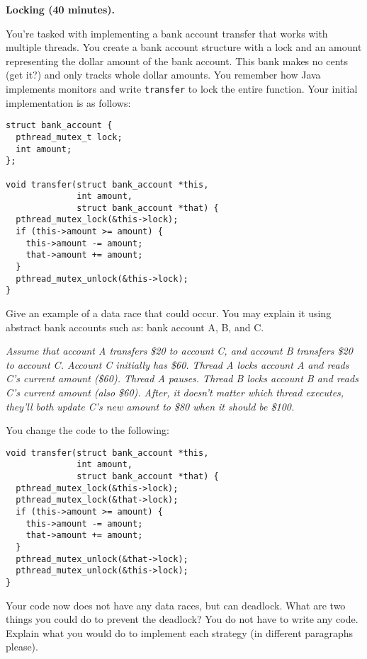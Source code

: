 \documentclass[12pt]{article}
\newenvironment{answer}{\begin{adjustwidth}{1cm}{}\itshape}{\end{adjustwidth}}
\begin{document}
\textbf{Locking (40 minutes).}

\vspace{1em}

You're tasked with implementing a bank account transfer that works with
multiple threads. You create a bank account structure with a lock and an amount
representing the dollar amount of the bank account. This bank makes no cents
(get it?) and only tracks whole dollar amounts. You remember how Java implements
monitors and write \texttt{transfer} to lock the entire function. Your initial
implementation is as follows:

\begin{lstlisting}
struct bank_account {
  pthread_mutex_t lock;
  int amount;
};

void transfer(struct bank_account *this,
              int amount,
              struct bank_account *that) {
  pthread_mutex_lock(&this->lock);
  if (this->amount >= amount) {
    this->amount -= amount;
    that->amount += amount;
  }
  pthread_mutex_unlock(&this->lock);
}
\end{lstlisting}

Give an example of a data race that could occur. You may explain it using
abstract bank accounts such as: bank account A, B, and C.

\begin{answer}
  Assume that account A transfers \$20 to account C, and account B transfers
  \$20 to account C. Account C initially has \$60. Thread A locks account
  A and reads C's current amount (\$60). Thread A pauses. Thread B locks account
  B and reads C's current amount (also \$60). After, it doesn't matter which
  thread executes, they'll both update C's new amount to \$80 when it should be
  \$100.
\end{answer}

\newpage

You change the code to the following:

\begin{lstlisting}
void transfer(struct bank_account *this,
              int amount,
              struct bank_account *that) {
  pthread_mutex_lock(&this->lock);
  pthread_mutex_lock(&that->lock);
  if (this->amount >= amount) {
    this->amount -= amount;
    that->amount += amount;
  }
  pthread_mutex_unlock(&that->lock);
  pthread_mutex_unlock(&this->lock);
}
\end{lstlisting}

Your code now does not have any data races, but can deadlock. What are
two things you could do to prevent the deadlock? You do not have to
write any code. Explain what you would do to implement each strategy (in
different paragraphs please).
\end{document}
